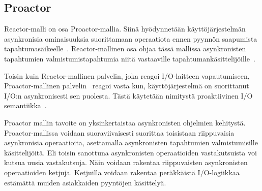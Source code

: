 \documentclass[finnish]{tktltiki2}%
\theoremstyle{definition}
\theoremstyle{remark}
\begin{document}
\subsection{Proactor}

Reactor-malli on osa Proactor-mallia.
Siinä hyödynnetään käyttöjärjestelmän asynkronisia ominaisuuksia suorittamaan
operaatiota ennen pyynnön saapumista tapahtumasäikeelle~\cite{hu_applying_1998}.
Reactor-mallinen osa ohjaa tässä mallissa asynkronisten tapahtumien
valmistumistapahtumia niitä vastaaville tapahtumankäsittelijöille~\cite{pyarali_proactor_1997}.

Toisin kuin Reactor-mallinen palvelin, joka reagoi I/O-laitteen vapautumiseen,
Proactor-mallinen palvelin~\cite{hu_applying_1998} reagoi vasta kun, käyttöjärjestelmä
on suorittanut I/O:n asynkronisesti sen puolesta. Tästä käytetään nimitystä
proaktiivinen I/O semantiikka~\cite{schmidt_reactor:_1995}.

Proactor mallin tavoite on yksinkertaistaa asynkronisten ohjelmien kehitystä.
Proactor-mallissa voidaan suoraviivaisesti suorittaa toisistaan riippuvaisia
asynkronisia operaatioita, asettamalla asynkronisten tapahtumien valmistumisille
käsittelijöitä. Eli toisin sanottuna asynkronisten operaatioiden vastakutsuista
voi kutsua uusia vastakutsuja. Näin voidaan rakentaa riippuvaisten
asynkronisten operaatioiden ketjuja. Ketjuilla voidaan
rakentaa peräkkäistä I/O-logiikkaa estämättä muiden asiakkaiden
pyyntöjen käsittelyä.
\end{document}
